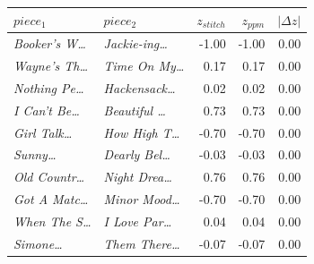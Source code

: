 \begin{tabular}{llrrr}
\toprule
$piece_1$ & $piece_2$ & $z_{stitch}$ & $z_{ppm}$ & $|\Delta z|$ \\
\midrule
\textit{Booker's W\dots} & \textit{Jackie-ing\dots} & -1.00 & -1.00 & 0.00 \\
\textit{Wayne's Th\dots} & \textit{Time On My\dots} & 0.17 & 0.17 & 0.00 \\
\textit{Nothing Pe\dots} & \textit{Hackensack\dots} & 0.02 & 0.02 & 0.00 \\
\textit{I Can't Be\dots} & \textit{Beautiful \dots} & 0.73 & 0.73 & 0.00 \\
\textit{Girl Talk\dots} & \textit{How High T\dots} & -0.70 & -0.70 & 0.00 \\
\textit{Sunny\dots} & \textit{Dearly Bel\dots} & -0.03 & -0.03 & 0.00 \\
\textit{Old Countr\dots} & \textit{Night Drea\dots} & 0.76 & 0.76 & 0.00 \\
\textit{Got A Matc\dots} & \textit{Minor Mood\dots} & -0.70 & -0.70 & 0.00 \\
\textit{When The S\dots} & \textit{I Love Par\dots} & 0.04 & 0.04 & 0.00 \\
\textit{Simone\dots} & \textit{Them There\dots} & -0.07 & -0.07 & 0.00 \\
\bottomrule
\end{tabular}
